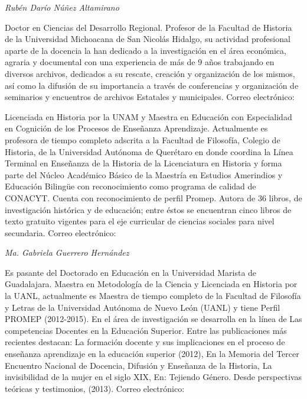 \bigskip

{ 
\textit{Rubén Darío Núñez Altamirano }}

{ 
Doctor en Ciencias del Desarrollo Regional. Profesor de la Facultad de
Historia de la Universidad Michoacana de San Nicolás Hidalgo, su actividad
profesional aparte de la docencia la han dedicado a la investigación en el
área económica, agraria y documental  con una experiencia de más de 9 años
trabajando en diversos archivos, dedicados a su rescate, creación y
organización de los mismos, así como la difusión de su importancia a través
de conferencias y organización de seminarios y encuentros de archivos
Estatales y municipales. Correo electrónico:
\href{mailto:oso_no@hotmailcom}{}}


\bigskip

{ 
}

{ 
Licenciada en Historia por la UNAM y Maestra
en Educación con Especialidad en Cognición de los Procesos de Enseñanza
Aprendizaje. Actualmente es profesora de tiempo completo adscrita a la
Facultad de Filosofía, Colegio de Historia, de la Universidad Autónoma de
Querétaro en donde coordina la Línea Terminal en Enseñanza de la Historia
de la Licenciatura en Historia y  forma parte del Núcleo Académico Básico
de la Maestría en Estudios Amerindios y Educación Bilingüe con
reconocimiento como programa de calidad de CONACYT. Cuenta con
reconocimiento de perfil Promep. Autora de 36 libros, de investigación
histórica y de educación; entre éstos se encuentran cinco  libros de texto
gratuito vigentes para el eje curricular  de ciencias sociales para nivel
secundaria.  Correo electrónico:\textit{
}\href{mailto:platapik@prodigy.net.mx}{}}


\bigskip

{ 
\textit{Ma. Gabriela Guerrero Hernández}}

{ 
Es pasante del Doctorado en Educación en la Universidad Marista de
Guadalajara. Maestra en Metodología de la Ciencia y Licenciada en Historia
por la UANL, actualmente es Maestra de tiempo completo  de la Facultad de
Filosofía y Letras de la Universidad Autónoma de Nuevo León (UANL) y tiene
Perfil PROMEP (2012-2015). En el área de investigación se desarrolla en la
línea de Las competencias Docentes en la Educación Superior. Entre las
publicaciones más recientes destacan: La formación docente y sus
implicaciones en el proceso de enseñanza aprendizaje en la educación
superior (2012), En la Memoria del Tercer Encuentro Nacional de Docencia,
Difusión y Enseñanza de la Historia, La invisibilidad de la mujer en el
siglo XIX, En: Tejiendo Género. Desde perspectivas teóricas y testimonios,
(2013). Correo electrónico:
\href{mailto:gaguh_70@yahoo.com.mx}{}}


